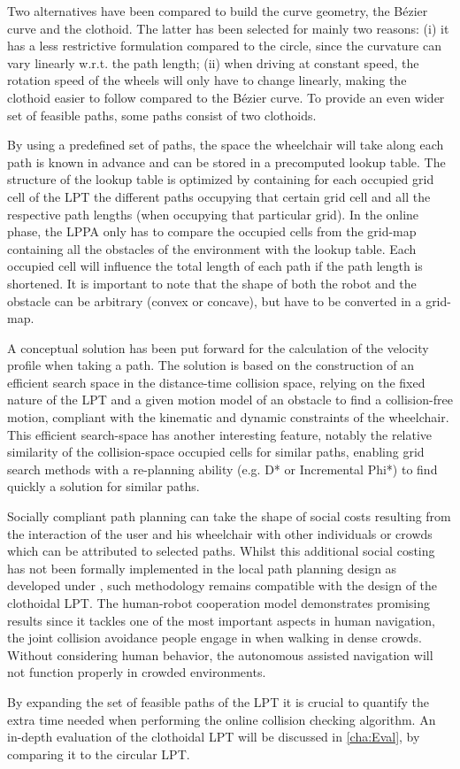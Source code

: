 Two alternatives have been compared to build the curve geometry, the Bézier curve and the clothoid. The latter has been selected for mainly two reasons: (i) it has a less restrictive formulation compared to the circle, since the curvature can vary linearly w.r.t. the path length; (ii) when driving at constant speed, the rotation speed of the wheels will only have to change linearly, making the clothoid easier to follow compared to the Bézier curve. To provide an even wider set of feasible paths, some paths consist of two clothoids. 

By using a predefined set of paths, the space the wheelchair will take along each path is known in advance and can be stored in a precomputed lookup table. The structure of the lookup table is optimized by containing for each occupied grid cell of the LPT the different paths occupying that certain grid cell and all the respective path lengths (when occupying that particular grid). In the online phase, the LPPA only has to compare the occupied cells from the grid-map containing all the obstacles of the environment with the lookup table. Each occupied cell will influence the total length of each path if the path length is shortened. It is important to note that the shape of both the robot and the obstacle can be arbitrary (convex or concave), but have to be converted in a grid-map.

A conceptual solution has been put forward for the calculation of the velocity profile when taking a path. The solution is based on the construction of an efficient search space in the distance-time collision space, relying on the fixed nature of the LPT and a given motion model of an obstacle to find a collision-free motion, compliant with the kinematic and dynamic constraints of the wheelchair. This efficient search-space has another interesting feature, notably the relative similarity of the collision-space occupied cells for similar paths, enabling grid search methods with a re-planning ability (e.g. D* or Incremental Phi*) to find quickly a solution for similar paths. 

Socially compliant path planning can take the shape of social costs resulting from the interaction of the user and his wheelchair with other individuals or crowds which can be attributed to selected paths. Whilst this additional social costing has not been formally implemented in the local path planning design as developed under , such methodology remains compatible with the design of the clothoidal LPT. The human-robot cooperation model demonstrates promising results since it tackles one of the most important aspects in human navigation, the joint collision avoidance people engage in when walking in dense crowds. Without considering human behavior, the autonomous assisted navigation will not function properly in crowded environments.

By expanding the set of feasible paths of the LPT it is crucial to quantify the extra time needed when performing the online collision checking algorithm.  An in-depth evaluation of the clothoidal LPT will be discussed in \cref{cha:Eval}, by comparing it to the circular LPT.